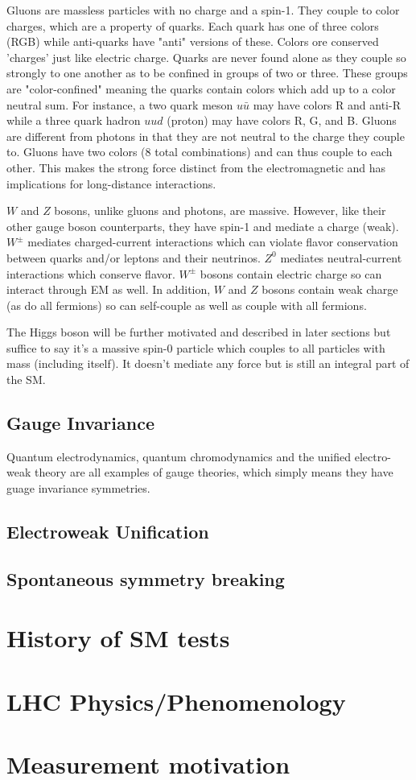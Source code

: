 Gluons are massless particles with no charge and a spin-1. They couple to color charges, which are a property of quarks. Each quark has one of three colors (RGB) while anti-quarks have "anti" versions of these. Colors ore conserved 'charges' just like electric charge. Quarks are never found alone as they couple so strongly to one another as to be confined in groups of two or three. These groups are "color-confined" meaning the quarks contain colors which add up to a color neutral sum. For instance, a two quark meson $u\bar{u}$ may have colors R and anti-R while a three quark hadron $uud$ (proton) may have colors R, G, and B. Gluons are different from photons in that they are not neutral to the charge they couple to. Gluons have two colors (8 total combinations) and can thus couple to each other. This makes the strong force distinct from the electromagnetic and has implications for long-distance interactions.
 
$W$ and $Z$ bosons, unlike gluons and photons, are massive. However, like their other gauge boson counterparts, they have spin-1 and mediate a charge (weak). $W^{\pm}$ mediates charged-current interactions which can violate flavor conservation between quarks and/or leptons and their neutrinos. $Z^{0}$ mediates neutral-current interactions which conserve flavor. $W^{\pm}$ bosons contain electric charge so can interact through EM as well. In addition, $W$ and $Z$ bosons contain weak charge (as do all fermions) so can self-couple as well as couple with all fermions. 
 
The Higgs boson will be further motivated and described in later sections but suffice to say it's a massive spin-0 particle which couples to all particles with mass (including itself). It doesn't mediate any force but is still an integral part of the SM.  

\subsection{Gauge Invariance}
Quantum electrodynamics, quantum chromodynamics and the unified electro-weak theory are all examples of gauge theories, which simply means they have guage invariance symmetries. 

\subsection{Electroweak Unification}
\subsection{Spontaneous symmetry breaking}
\section{History of SM tests}
\section{LHC Physics/Phenomenology}
\section{Measurement motivation}

